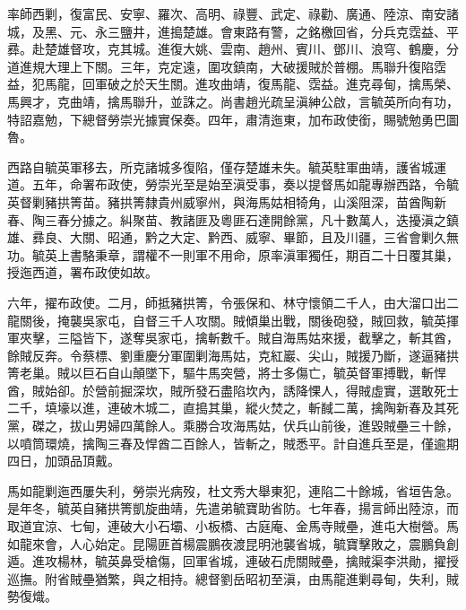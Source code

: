 \begin{pinyinscope}
率師西剿，復富民、安寧、羅次、高明、祿豐、武定、祿勸、廣通、陸涼、南安諸城，及黑、元、永三鹽井，進搗楚雄。會東路有警，之銘檄回省，分兵克霑益、平彞。赴楚雄督攻，克其城。進復大姚、雲南、趙州、賓川、鄧川、浪穹、鶴慶，分道進規大理上下關。三年，克定遠，圍攻鎮南，大破援賊於普棚。馬聯升復陷霑益，犯馬龍，回軍破之於天生關。進攻曲靖，復馬龍、霑益。進克尋甸，擒馬榮、馬興才，克曲靖，擒馬聯升，並誅之。尚書趙光疏呈滇紳公啟，言毓英所向有功，特詔嘉勉，下總督勞崇光據實保奏。四年，肅清迤東，加布政使銜，賜號勉勇巴圖魯。

西路自毓英軍移去，所克諸城多復陷，僅存楚雄未失。毓英駐軍曲靖，護省城運道。五年，命署布政使，勞崇光至是始至滇受事，奏以提督馬如龍專辦西路，令毓英督剿豬拱箐苗。豬拱箐隸貴州威寧州，與海馬姑相犄角，山溪阻深，苗酋陶新春、陶三春分據之。糾聚苗、教諸匪及粵匪石達開餘黨，凡十數萬人，迭擾滇之鎮雄、彞良、大關、昭通，黔之大定、黔西、威寧、畢節，且及川疆，三省會剿久無功。毓英上書駱秉章，謂權不一則軍不用命，原率滇軍獨任，期百二十日覆其巢，授迤西道，署布政使如故。

六年，擢布政使。二月，師抵豬拱箐，令張保和、林守懷領二千人，由大溜口出二龍關後，掩襲吳家屯，自督三千人攻關。賊傾巢出戰，關後砲發，賊回救，毓英揮軍夾擊，三隘皆下，遂奪吳家屯，擒斬數千。賊自海馬姑來援，截擊之，斬其酋，餘賊反奔。令蔡標、劉重慶分軍圍剿海馬姑，克紅巖、尖山，賊援乃斷，遂逼豬拱箐老巢。賊以巨石自山顛墜下，驅牛馬突營，將士多傷亡，毓英督軍搏戰，斬悍酋，賊始卻。於營前掘深坎，賊所發石盡陷坎內，誘降惈人，得賊虛實，選敢死士二千，填壕以進，連破木城二，直搗其巢，縱火焚之，斬馘二萬，擒陶新春及其死黨，磔之，拔山男婦四萬餘人。乘勝合攻海馬姑，伏兵山前後，進毀賊壘三十餘，以噴筒環燒，擒陶三春及悍酋二百餘人，皆斬之，賊悉平。計自進兵至是，僅逾期四日，加頭品頂戴。

馬如龍剿迤西屢失利，勞崇光病歿，杜文秀大舉東犯，連陷二十餘城，省垣告急。是年冬，毓英自豬拱箐凱旋曲靖，先遣弟毓寶助省防。七年春，揚言師出陸涼，而取道宜涼、七甸，連破大小石壩、小板橋、古庭庵、金馬寺賊壘，進屯大樹營。馬如龍來會，人心始定。昆陽匪首楊震鵬夜渡昆明池襲省城，毓寶擊敗之，震鵬負創遁。進攻楊林，毓英鼻受槍傷，回軍省城，連破石虎關賊壘，擒賊渠李洪勛，擢授巡撫。附省賊壘猶繁，與之相持。總督劉岳昭初至滇，由馬龍進剿尋甸，失利，賊勢復熾。


\end{pinyinscope}
